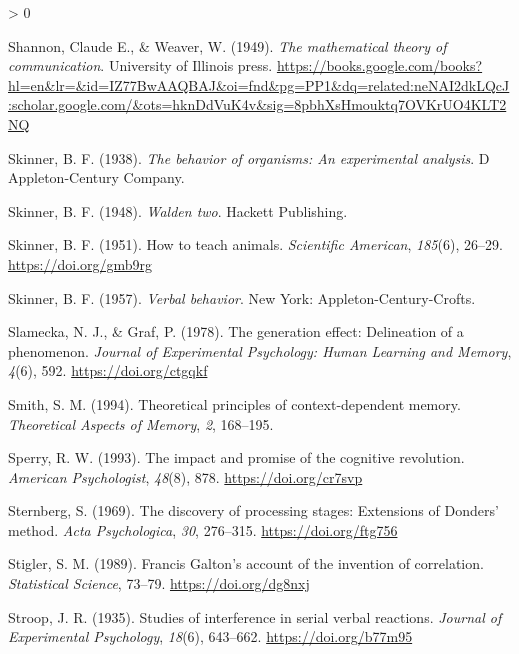 \documentclass[
  oneside,
  12pt]{crumpbook}
\newlength{\cslhangindent}
\newenvironment{CSLReferences}[2] %
 {%
  \setlength{\parindent}{0pt}
  \ifodd #1 \everypar{\setlength{\hangindent}{\cslhangindent}}\ignorespaces\fi
  \ifnum #2 > 0
  \setlength{\parskip}{#2\baselineskip}
  \fi
 }%
 {}
\begin{document}
\begin{CSLReferences}{1}{0}
\leavevmode\hypertarget{ref-shannonMathematicalTheoryCommunication1949}{}%
Shannon, Claude E., \& Weaver, W. (1949). \emph{The mathematical theory of communication}. {University of Illinois press}. \url{https://books.google.com/books?hl=en\&lr=\&id=IZ77BwAAQBAJ\&oi=fnd\&pg=PP1\&dq=related:neNAI2dkLQcJ:scholar.google.com/\&ots=hknDdVuK4v\&sig=8pbhXsHmouktq7OVKrUO4KLT2NQ}

\leavevmode\hypertarget{ref-skinnerBehaviorOrganismsExperimental1938}{}%
Skinner, B. F. (1938). \emph{The behavior of organisms: {An} experimental analysis}. {D Appleton-Century Company}.

\leavevmode\hypertarget{ref-skinnerWaldenTwo1948}{}%
Skinner, B. F. (1948). \emph{Walden two}. {Hackett Publishing}.

\leavevmode\hypertarget{ref-skinnerHowTeachAnimals1951}{}%
Skinner, B. F. (1951). How to teach animals. \emph{Scientific American}, \emph{185}(6), 26--29. \url{https://doi.org/gmb9rg}

\leavevmode\hypertarget{ref-skinnerVerbalBehavior1957}{}%
Skinner, B. F. (1957). \emph{Verbal behavior}. {New York: Appleton-Century-Crofts}.

\leavevmode\hypertarget{ref-slameckaGenerationEffectDelineation1978a}{}%
Slamecka, N. J., \& Graf, P. (1978). The generation effect: {Delineation} of a phenomenon. \emph{Journal of Experimental Psychology: Human Learning and Memory}, \emph{4}(6), 592. \url{https://doi.org/ctgqkf}

\leavevmode\hypertarget{ref-smithTheoreticalPrinciplesContextdependent1994}{}%
Smith, S. M. (1994). Theoretical principles of context-dependent memory. \emph{Theoretical Aspects of Memory}, \emph{2}, 168--195.

\leavevmode\hypertarget{ref-sperryImpactPromiseCognitive1993}{}%
Sperry, R. W. (1993). The impact and promise of the cognitive revolution. \emph{American Psychologist}, \emph{48}(8), 878. \url{https://doi.org/cr7svp}

\leavevmode\hypertarget{ref-sternbergDiscoveryProcessingStages1969a}{}%
Sternberg, S. (1969). The discovery of processing stages: {Extensions} of {Donders}' method. \emph{Acta Psychologica}, \emph{30}, 276--315. \url{https://doi.org/ftg756}

\leavevmode\hypertarget{ref-stiglerFrancisGaltonAccount1989}{}%
Stigler, S. M. (1989). Francis {Galton}'s account of the invention of correlation. \emph{Statistical Science}, 73--79. \url{https://doi.org/dg8nxj}

\leavevmode\hypertarget{ref-Stroop1935}{}%
Stroop, J. R. (1935). Studies of interference in serial verbal reactions. \emph{Journal of Experimental Psychology}, \emph{18}(6), 643--662. \url{https://doi.org/b77m95}


\end{CSLReferences}
\end{document}
